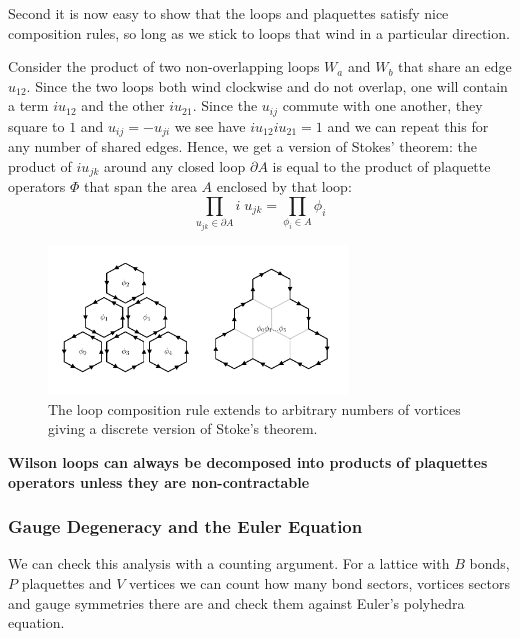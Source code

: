 Second it is now easy to show that the loops and plaquettes satisfy nice
composition rules, so long as we stick to loops that wind in a
particular direction.

Consider the product of two non-overlapping loops \(W_a\) and \(W_b\)
that share an edge \(u_{12}\). Since the two loops both wind clockwise
and do not overlap, one will contain a term \(i u_{12}\) and the other
\(i u_{21}\). Since the \(u_{ij}\) commute with one another, they square
to \(1\) and \(u_{ij} = -u_{ji}\) we see have \(i u_{12} i u_{21} = 1\)
and we can repeat this for any number of shared edges. Hence, we get a
version of Stokes' theorem: the product of \(i u_{jk}\) around any
closed loop \(\partial A\) is equal to the product of plaquette
operators \(\Phi\) that span the area \(A\) enclosed by that loop:
\[\prod_{u_{jk} \in \partial A} i \; u_{jk} = \prod_{\phi_i \in A} \phi_i\]

\begin{figure}
\hypertarget{fig:stokes_theorem}{%
\centering
\includegraphics[width=0.71\textwidth,height=\textheight]{figure_code/amk_chapter/stokes_theorem/stokes_theorem.pdf}
\caption{The loop composition rule extends to arbitrary numbers of
vortices giving a discrete version of Stoke's
theorem.}\label{fig:stokes_theorem}
}
\end{figure}

\textbf{Wilson loops can always be decomposed into products of
plaquettes operators unless they are non-contractable}

\hypertarget{gauge-degeneracy-and-the-euler-equation}{%
\subsubsection{Gauge Degeneracy and the Euler
Equation}\label{gauge-degeneracy-and-the-euler-equation}}

We can check this analysis with a counting argument. For a lattice with
\(B\) bonds, \(P\) plaquettes and \(V\) vertices we can count how many
bond sectors, vortices sectors and gauge symmetries there are and check
them against Euler's polyhedra equation.

